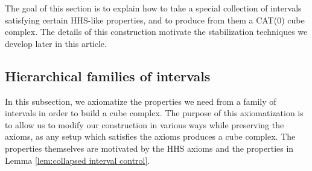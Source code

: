\documentclass{amsart}
\theoremstyle{definition}
\theoremstyle{remark}
\theoremstyle{definition}
\begin{document}
The goal of this section is to explain how to take a special collection of intervals satisfying certain HHS-like properties, and to produce from them a CAT(0) cube complex.  The details of this construction motivate the stabilization techniques we develop later in this article.


\subsection{Hierarchical families of intervals}

In this subsection, we axiomatize the properties we need from a family of intervals in order to build a cube complex.  The purpose of this axiomatization is to allow us to modify our construction in various ways while preserving the axioms, as any setup which satisfies the axioms produces a cube complex.  The properties themselves are motivated by the HHS axioms and the properties in Lemma \ref{lem:collapsed interval control}.
\end{document}
